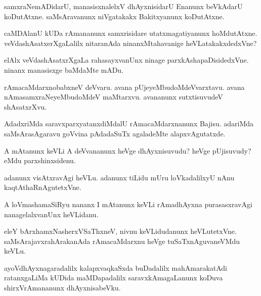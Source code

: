 \documentclass{article}
\begin{document}
\begin{mn}%
samxraNemADidarU, manasisxnalelxV dhAyxnisidarU Enanunx beVkAdarU koDutAtxne. 
saMsAravanunx niVgatakakx Bakitxyanunx koDutAtxne.
\end{mn}

\begin{mn}%
caMDAlanU kUDa rAmananunx samxrisidare utatxmagatiyanunx hoMdutAtxne. 
veVdashAsatxerXgaLalilx nitaranAda ninanxMtahavanige heVLatakakxdedxVne? 
\end{mn}

\begin{mn}%
elAlx veVdashAsatxrXgaLa rahasayxvanUnx ninage parxkAshapaDisidedxVne. ninanx manasisxge 
baMdaMte mADu.
\end{mn}

\begin{mn}%
rAmacaMdarxnobabxneV deVvaru. avana pUjeyeMbudoMdeVvarxtavu. avana nAmasamxraNeyeMbudoMdeV
maMtarxvu. avananunx sutxtisuvudeV shAsatxrXvu.
\end{mn}

\begin{mn}%
AdadxriMda saravxparxyatanxdiMdalU rAmacaMdarxnanunx Bajisu. adariMda saMsArasAgaravu 
goVvina pAdadaSuTx agaladeMte alapxvAgutatxde.
\end{mn}

\begin{mn}%
A mAtanunx keVLi A deVvananunx heVge dhAyxnisuvudu? heVge pUjisuvudy? eMdu parxshinxsidenu.
\end{mn}

\begin{mn}%
adanunx visAtxravAgi heVLu. adanunx tiLidu mUru loVkadalilxyU nAnu kaqtAthaRnAgutetxVne.
\end{mn}

\begin{mn}%
A loVmashamaSiRyu nananx I mAtanunx keVLi rAmadhAyxna purasasxravAgi nanagelalxvanUnx 
heVLidanu.
\end{mn}

\begin{mn}%
eleY bArxhamxNasherxVSaThxneV, nivnu keVLidudanunx heVLutetxVne. saMsArajavxrahArakanAda 
rAmacaMdarxnu heVge tuSaTxnAguvaneVMdu keVLu.
\end{mn}

\begin{mn}%
ayoVdhAyxnagaradalilx kalapxvaqkaSxda buDadalilx mahAmarakatAdi ratanxgaLiMa kUDida 
maMDapadalilx saravxkAmagaLanunx koDuva shirxVrAmananunx dhAyxnisabeVku.
\end{mn}
\end{document}

